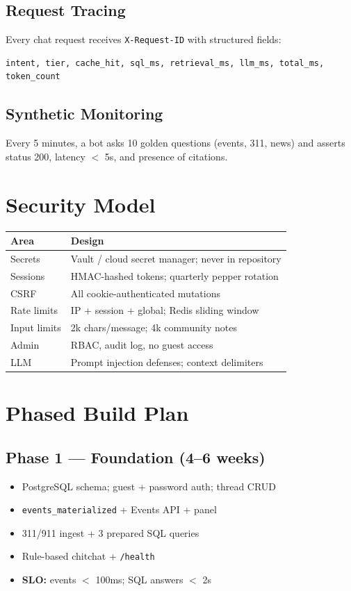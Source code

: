 \documentclass[11pt,a4paper]{article}
\begin{document}
\subsection{Request Tracing}
Every chat request receives \texttt{X-Request-ID} with structured fields:
\begin{lstlisting}
intent, tier, cache_hit, sql_ms, retrieval_ms, llm_ms, total_ms, token_count
\end{lstlisting}

\subsection{Synthetic Monitoring}
Every 5 minutes, a bot asks 10 golden questions (events, 311, news) and asserts status 200, latency $<$ 5s, and presence of citations.

\section{Security Model}

\begin{table}[h]
\centering
\small
\begin{tabular}{@{}lp{8cm}@{}}
\toprule
\textbf{Area} & \textbf{Design} \\
\midrule
Secrets & Vault / cloud secret manager; never in repository \\
Sessions & HMAC-hashed tokens; quarterly pepper rotation \\
CSRF & All cookie-authenticated mutations \\
Rate limits & IP + session + global; Redis sliding window \\
Input limits & 2k chars/message; 4k community notes \\
Admin & RBAC, audit log, no guest access \\
LLM & Prompt injection defenses; context delimiters \\
\bottomrule
\end{tabular}
\end{table}

\section{Phased Build Plan}

\subsection{Phase 1 --- Foundation (4--6 weeks)}
\begin{itemize}[noitemsep]
  \item PostgreSQL schema; guest + password auth; thread CRUD
  \item \texttt{events\_materialized} + Events API + panel
  \item 311/911 ingest + 3 prepared SQL queries
  \item Rule-based chitchat + \texttt{/health}
  \item \textbf{SLO:} events $<$ 100ms; SQL answers $<$ 2s
\end{itemize}
\end{document}
